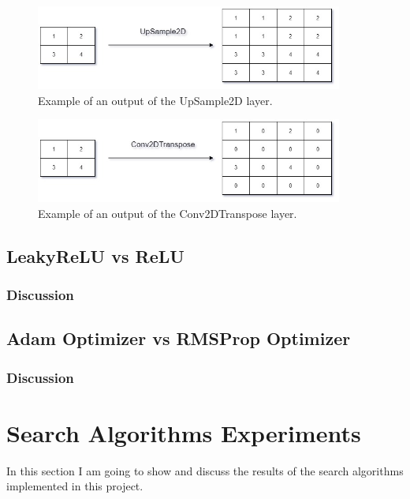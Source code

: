 \documentclass[12pt,a4paper,oneside]{memoir}
\begin{document}
\begin{figure}[H]
\centering
\includegraphics[width=0.9\textwidth]{images/sample1.jpg}
\caption{Example of an output of the UpSample2D layer.}
\centering
\label{fig:upsamp1}
\end{figure}



\begin{figure}[H]
\centering
\includegraphics[width=0.9\textwidth]{images/upsample2.png}
\caption{Example of an output of the Conv2DTranspose layer.}
\centering
\label{fig:upsamp2}
\end{figure}



\subsection{LeakyReLU vs ReLU}


\subsubsection{Discussion}


\subsection{Adam Optimizer vs RMSProp Optimizer}

\subsubsection{Discussion}




\section{Search Algorithms Experiments}
In this section I am going to show and discuss the results of the search algorithms implemented in this project.
\end{document}
